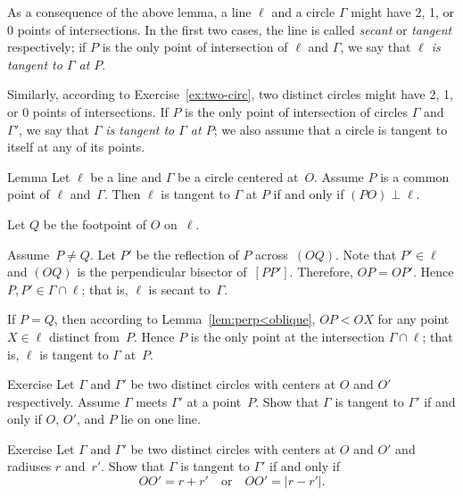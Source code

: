 As a consequence of the above lemma, 
a line $\ell$ and a circle $\Gamma$ might have 2, 1, or 0 points of intersections.
In the first two cases, the line is called \emph{secant} or \emph{tangent} respectively;
if $P$ is the only point of intersection of $\ell$ and $\Gamma$,
we say that \textit{$\ell$ is tangent to $\Gamma$ at $P$}. 

Similarly, according to Exercise~\ref{ex:two-circ},
two distinct circles might have 2, 1, or 0 points of intersections.
If $P$ is the only point of intersection of circles $\Gamma$ and $\Gamma'$,
we say that \emph{$\Gamma$ is tangent to $\Gamma$ at $P$}; we also assume that a circle is tangent to itself at any of its points.

\begin{thm}[\abs]{Lemma}\label{lem:tangent}
Let $\ell$ be a line and $\Gamma$ be a circle centered at~$O$.
Assume $P$ is a common point of $\ell$ and~$\Gamma$. 
Then $\ell$ is tangent to $\Gamma$ at $P$ if and only if $(PO)\perp \ell$.
\end{thm}

Let $Q$ be the footpoint of $O$ on~$\ell$.

Assume~$P\ne Q$.
Let $P'$ be the reflection of $P$ across~$(OQ)$.
Note that $P'\in\ell$ and $(OQ)$ is the perpendicular bisector of~$[PP']$.
Therefore, $OP=OP'$.
Hence $P,P'\in \Gamma\cap \ell$;
that is, $\ell$ is secant to~$\Gamma$.

If $P=Q$, 
then according to Lemma~\ref{lem:perp<oblique},
$OP<OX$ for any point $X\in \ell$ distinct from~$P$.
Hence $P$ is the only point at the intersection $\Gamma\cap\ell$;
that is, $\ell$ is tangent to $\Gamma$ at~$P$. 
\qeds

\begin{thm}{Exercise}\label{ex:tangent-circles}
Let $\Gamma$ and $\Gamma'$ be two distinct circles with centers at $O$ and $O'$ respectively. 
Assume $\Gamma$ meets $\Gamma'$ at a point~$P$.
Show that $\Gamma$ is tangent to $\Gamma'$ if and only if $O$, $O'$, and $P$ lie on one line.
\end{thm}

\begin{thm}{Exercise}\label{ex:tangent-circles-2}
Let $\Gamma$ and $\Gamma'$ be two distinct circles with centers at $O$ and $O'$ and radiuses $r$ and~$r'$.
Show that $\Gamma$ is tangent to $\Gamma'$ if and only if
$$OO'=r+r'
\quad
\text{or}\quad
OO'=|r-r'|.$$

\end{thm}

